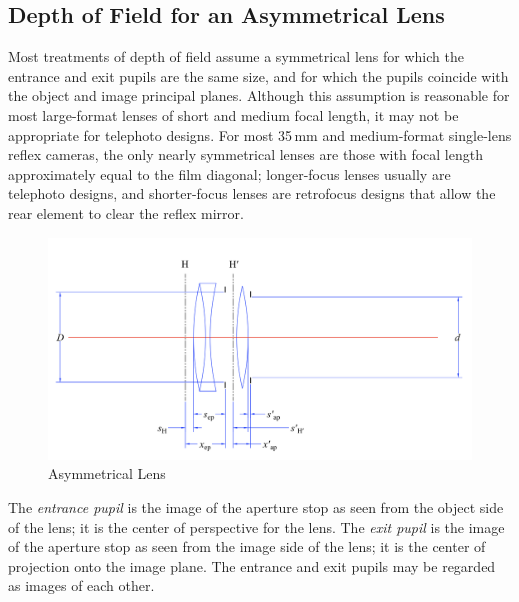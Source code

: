 \documentclass[11pt, oneside]{scrartcl}   	%
\begin{document}
\subsection{Depth of Field for an Asymmetrical Lens}
Most treatments of depth of field assume a symmetrical lens for which the entrance and exit pupils are the same size, and for which the pupils coincide with the object and image principal planes. Although this assumption is reasonable for most large-format lenses of short and medium focal length, it may not be appropriate for telephoto designs. For most  35\,mm and medium-format single-lens reflex cameras, the only nearly symmetrical lenses are those with focal length approximately equal to the film diagonal; longer-focus lenses usually are telephoto designs, and shorter-focus lenses are retrofocus designs that allow the rear element to clear the reflex mirror.
\begin{figure}[htbp] %
   \centering
   \includegraphics[width=\linewidth]{figure/fig_dofd_2} 
   \caption{Asymmetrical Lens}
   \label{fig:asymlens}
\end{figure}
The \emph{entrance pupil} is the image of the aperture stop as seen from the object side of the lens; it is the center of perspective for the lens. The \emph{exit pupil} is the image of the aperture stop as seen from the image side of the lens; it is the center of projection onto the image plane. The entrance and exit pupils may be regarded as images of each other.
\end{document}

